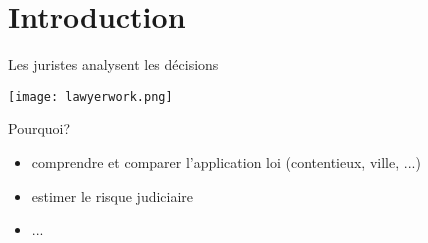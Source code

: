 \section{Introduction}

\begin{frame}[c]{Les juristes analysent les décisions}
	\begin{center}
		\texttt{[image: lawyerwork.png]}
	\end{center}
	
	\begin{block}{Pourquoi?}
		\begin{itemize}
			\item comprendre et comparer l'application loi (contentieux, ville, ...)
			\item estimer le risque judiciaire
			\item ... %
		\end{itemize}
	\end{block}
\end{frame}


